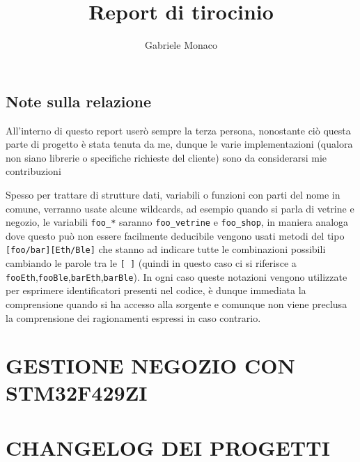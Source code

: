 \documentclass[a4paper,12pt]{article}
\title{Report di tirocinio}
\author{Gabriele Monaco}
\begin{document}
\maketitle

\newpage

\tableofcontents

\setlength{\parindent}{0pt}

\newcommand{\textdesc}[1]{\textsf{\color{teal}#1}}

\newpage

\begin{em}

  \subsection{Note sulla relazione}

  All'interno di questo report user\`o sempre la terza persona, nonostante ci\`o questa parte di progetto \`e stata tenuta da me, dunque le varie implementazioni (qualora non siano librerie o specifiche richieste del cliente) sono da considerarsi mie contribuzioni

  Spesso per trattare di strutture dati, variabili o funzioni con parti del nome in comune, verranno usate alcune wildcards, ad esempio quando si parla di vetrine e negozio, le variabili \textup{\texttt{foo\_*}} saranno \textup{\texttt{foo\_vetrine}} e \textup{\texttt{foo\_shop}}, in maniera analoga dove questo pu\`o non essere facilmente deducibile vengono usati metodi del tipo \textup{\texttt{[foo/bar][Eth/Ble]}} che stanno ad indicare tutte le combinazioni possibili cambiando le parole tra le \textup{\texttt{[ ]}} (quindi in questo caso ci si riferisce a \textup{\texttt{fooEth}},\textup{\texttt{fooBle}},\textup{\texttt{barEth}},\textup{\texttt{barBle}}). In ogni caso queste notazioni vengono utilizzate per esprimere identificatori presenti nel codice, \`e dunque immediata la comprensione quando si ha accesso alla sorgente e comunque non viene preclusa la comprensione dei ragionamenti espressi in caso contrario.

\end{em}

\section{GESTIONE NEGOZIO CON STM32F429ZI}



\newpage

\section{CHANGELOG DEI PROGETTI}


\end{document}
